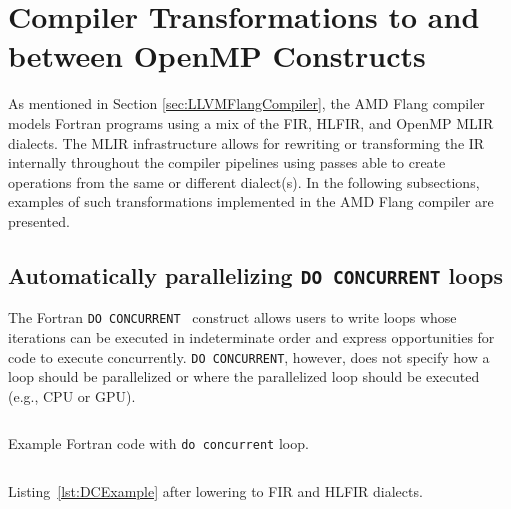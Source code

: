 \documentclass[acmtog,natbib=false]{acmart}
\newcommand{\code}[1]{\texttt{#1}\xspace}
\begin{document}
\section{Compiler Transformations to and between OpenMP Constructs}

As mentioned in Section \ref{sec:LLVMFlangCompiler}, the AMD Flang compiler models Fortran programs using a mix of the \ac{FIR}, \ac{HLFIR}, and OpenMP \ac{MLIR} dialects.
The \ac{MLIR} infrastructure allows for rewriting or transforming the \ac{IR} internally throughout the compiler pipelines using passes able to create operations from the same or different dialect(s).
In the following subsections, examples of such transformations implemented in the AMD Flang compiler are presented.

\subsection{Automatically parallelizing \code{DO CONCURRENT} loops}
\label{sec:DCPar}

The Fortran \code{DO CONCURRENT}~\cite{F2023} construct allows users to write loops whose iterations can be executed in indeterminate order and express opportunities for code to execute concurrently.
\code{DO CONCURRENT}, however, does not specify how a loop should be parallelized or where the parallelized loop should be executed (e.g., CPU or GPU).

\begin{listing}[t]
\inputminted{Fortran}{code/dc_saxpy.f90}
\caption{Example Fortran code with \code{do concurrent} loop.}
\label{lst:DCExample}
\end{listing}

\begin{listing}[t]
\inputminted{MLIR-lexer.py:MlirLexer -x}{code/dc_fir.mlir}
\caption{Listing~\ref{lst:DCExample} after lowering to \acs{FIR} and \acs{HLFIR} dialects.}
\label{lst:DCFIRExample}
\end{listing}
\end{document}
